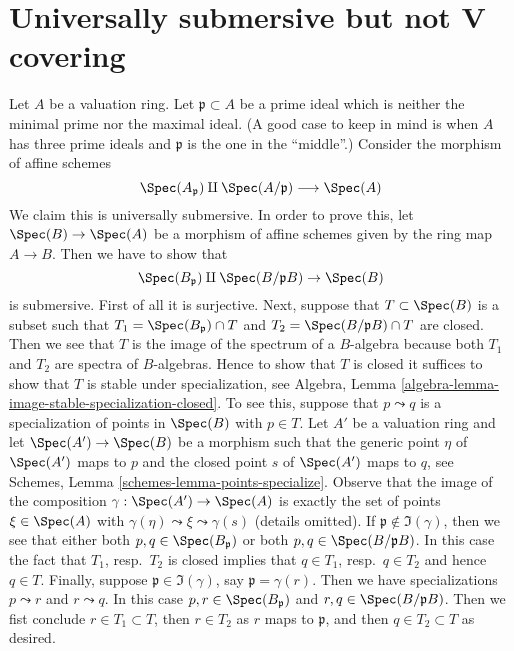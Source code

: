 \section{Universally submersive but not V covering}
\label{section-universally-submersive-not-V}

\noindent
Let $A$ be a valuation ring. Let $\mathfrak p \subset A$ be a prime
ideal which is neither the minimal prime nor the maximal ideal.
(A good case to keep in mind is when $A$ has three prime ideals
and $\mathfrak p$ is the one in the ``middle''.)
Consider the morphism of affine schemes
$$
\Spec(A_\mathfrak p) \amalg \Spec(A/\mathfrak p) \longrightarrow \Spec(A)
$$
We claim this is universally submersive. In order to prove this, let
$\Spec(B) \to \Spec(A)$ be a morphism of affine schemes given by the ring
map $A \to B$. Then we have to show that
$$
\Spec(B_\mathfrak p) \amalg \Spec(B/\mathfrak pB) \to \Spec(B)
$$
is submersive. First of all it is surjective. Next, suppose that
$T \subset \Spec(B)$ is a subset such that
$T_1 = \Spec(B_\mathfrak p) \cap T$ and $T_2 = \Spec(B/\mathfrak p B) \cap T$
are closed. Then we see that $T$ is the image of the spectrum
of a $B$-algebra because both $T_1$ and $T_2$ are spectra of $B$-algebras.
Hence to show that $T$ is closed it suffices to show that
$T$ is stable under specialization, see
Algebra, Lemma \ref{algebra-lemma-image-stable-specialization-closed}.
To see this, suppose that $p \leadsto q$ is a specialization
of points in $\Spec(B)$ with $p \in T$.
Let $A'$ be a valuation ring and let $\Spec(A') \to \Spec(B)$
be a morphism such that the generic point $\eta$ of $\Spec(A')$
maps to $p$ and the closed point $s$ of $\Spec(A')$ maps to $q$, see
Schemes, Lemma \ref{schemes-lemma-points-specialize}.
Observe that the image of the composition $\gamma : \Spec(A') \to \Spec(A)$
is exactly the set of points $\xi \in \Spec(A)$ with
$\gamma(\eta) \leadsto \xi \leadsto \gamma(s)$ (details omitted).
If $\mathfrak p \not \in \Im(\gamma)$, then we see that
either both $p, q \in \Spec(B_\mathfrak p)$ or
both $p, q \in \Spec(B/\mathfrak pB)$.
In this case the fact that $T_1$, resp.\ $T_2$ is closed
implies that $q \in T_1$, resp.\ $q \in T_2$ and hence $q \in T$.
Finally, suppose $\mathfrak p \in \Im(\gamma)$, say
$\mathfrak p = \gamma(r)$. Then we have specializations
$p \leadsto r$ and $r \leadsto q$. In this case
$p, r \in \Spec(B_\mathfrak p)$ and $r, q \in \Spec(B/\mathfrak pB)$.
Then we fist conclude $r \in T_1 \subset T$, then
$r \in T_2$ as $r$ maps to $\mathfrak p$, and then $q \in T_2 \subset T$
as desired.

